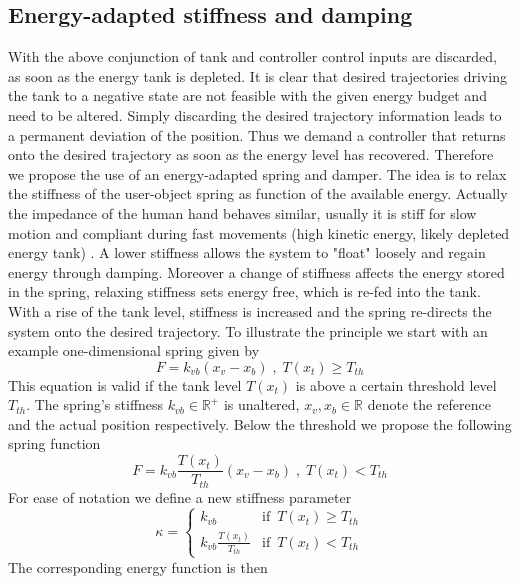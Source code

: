 \documentclass[a4paper,twoside, openright,12pt]{report}
\begin{document}
 
\subsection{Energy-adapted stiffness and damping}\label{SS:EnergyAdaptedStiffness}
With the above conjunction of tank and controller control inputs are discarded, as soon as the energy tank is depleted. It is clear that desired trajectories driving the tank to a negative state are not feasible with the given energy budget and need to be altered. Simply discarding the desired trajectory information leads to a permanent deviation of the position. Thus we demand a controller that returns onto the desired trajectory as soon as the energy level has recovered. Therefore we propose the use of an energy-adapted spring and damper. The idea is to relax the stiffness of the user-object spring as function of the available energy. Actually the impedance of the human hand behaves similar, usually it is stiff for slow motion and compliant during fast movements (high kinetic energy, likely depleted energy tank) \cite{Hogan_84b}. A lower stiffness allows the system to "float" loosely and regain energy through damping. Moreover a change of stiffness affects the energy stored in the spring, relaxing stiffness sets energy free, which is re-fed into the tank. With a rise of the tank level, stiffness is increased and the spring re-directs the system onto the desired trajectory. To illustrate the principle we start with an example one-dimensional spring given by
\begin{equation}
F = k_{vb}(x_v-x_b) \;,\; T(x_t)\geq T_{th}
\end{equation}
This equation is valid if the tank level $T(x_t)$ is above a certain threshold level $T_{th}$. The spring's stiffness $k_{vb} \in \mathbb{R}^+$ is unaltered, $x_v, x_b \in \mathbb{R}$ denote the reference and the actual position respectively. Below the threshold we propose the following spring function
\begin{equation}
F = k_{vb}\frac{T(x_t)}{T_{th}}(x_v-x_b) \;,\; T(x_t)<T_{th}
\end{equation}
For ease of notation we define a new stiffness parameter
\begin{equation}
\kappa = \begin{cases}
k_{vb} & \text{if } \, T(x_t)\geq T_{th} \\
k_{vb} \frac{T(x_t)}{T_{th}} & \text{if } \, T(x_t) < T_{th}
\end{cases}
\end{equation}
The corresponding energy function is then
\end{document}
